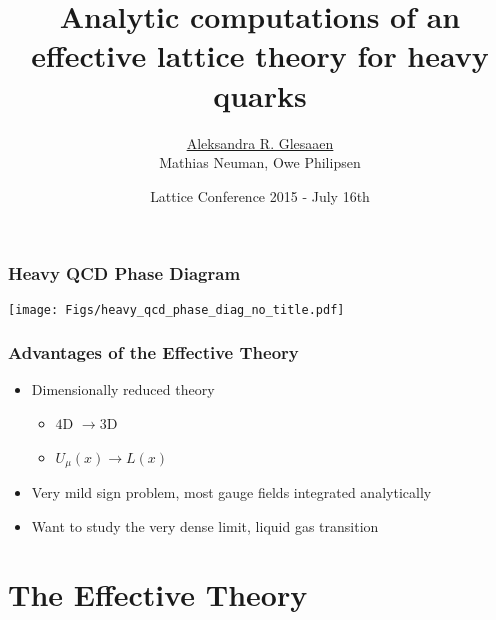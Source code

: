 \documentclass[12pt,a4paper,dvipsnames,usenames,handout]{beamer}
\title{Analytic computations of an effective lattice theory for heavy quarks}
\author{\underline{Aleksandra R. Glesaaen}\\[2pt]\small Mathias Neuman, Owe Philipsen}%
\institute{\texttt{[image: Figs/GU-Logo-blau-CMYK.pdf]}}
\date{Lattice Conference 2015 - July 16th}
\begin{document}
\setlength{\abovedisplayskip}{0pt}
\setlength{\belowdisplayskip}{0pt}

\begin{frame}[plain]
  \titlepage
\end{frame}

\setcounter{framenumber}{0}

\begin{frame}[plain]
  \tableofcontents
\end{frame}

\begin{frame}
  \frametitle{Heavy QCD Phase Diagram}

  {\centering
    \texttt{[image: Figs/heavy\_qcd\_phase\_diag\_no\_title.pdf]}
  \par}


\end{frame}

\begin{frame}
  \frametitle{Advantages of the Effective Theory}

  \begin{itemize}
    \setlength\itemsep{2em}
    \item Dimensionally reduced theory
    \begin{itemize}
      \item $4$D $\to 3$D
      \item $U_{\mu}(x) \to L(x)$
    \end{itemize}
    \item Very mild sign problem, most gauge fields integrated analytically
    \item Want to study the very dense limit, liquid gas transition
  \end{itemize}

\end{frame}

\section{The Effective Theory}

\sectionframe
\end{document}
